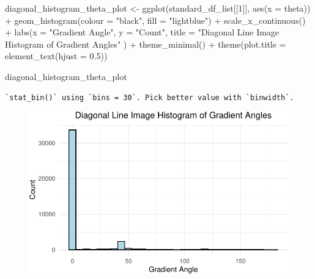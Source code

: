 \documentclass[
  letterpaper,
  DIV=11,
  numbers=noendperiod]{scrreprt}
\newenvironment{Shaded}{\begin{snugshade}}{\end{snugshade}}
\newcommand{\AttributeTok}[1]{\textcolor[rgb]{0.40,0.45,0.13}{#1}}
\newcommand{\DecValTok}[1]{\textcolor[rgb]{0.68,0.00,0.00}{#1}}
\newcommand{\FloatTok}[1]{\textcolor[rgb]{0.68,0.00,0.00}{#1}}
\newcommand{\FunctionTok}[1]{\textcolor[rgb]{0.28,0.35,0.67}{#1}}
\newcommand{\NormalTok}[1]{\textcolor[rgb]{0.00,0.23,0.31}{#1}}
\newcommand{\OtherTok}[1]{\textcolor[rgb]{0.00,0.23,0.31}{#1}}
\newcommand{\SpecialCharTok}[1]{\textcolor[rgb]{0.37,0.37,0.37}{#1}}
\newcommand{\StringTok}[1]{\textcolor[rgb]{0.13,0.47,0.30}{#1}}
\begin{document}
\begin{Shaded}
\begin{Highlighting}[]
\NormalTok{diagonal\_histogram\_theta\_plot }\OtherTok{\textless{}{-}}
  \FunctionTok{ggplot}\NormalTok{(standard\_df\_list[[}\DecValTok{1}\NormalTok{]], }\FunctionTok{aes}\NormalTok{(}\AttributeTok{x =}\NormalTok{ theta)) }\SpecialCharTok{+}
  \FunctionTok{geom\_histogram}\NormalTok{(}\AttributeTok{colour =} \StringTok{"black"}\NormalTok{, }\AttributeTok{fill =} \StringTok{"lightblue"}\NormalTok{) }\SpecialCharTok{+}
  \FunctionTok{scale\_x\_continuous}\NormalTok{() }\SpecialCharTok{+} 
  \FunctionTok{labs}\NormalTok{(}\AttributeTok{x =} \StringTok{"Gradient Angle"}\NormalTok{, }
       \AttributeTok{y =} \StringTok{"Count"}\NormalTok{, }
       \AttributeTok{title =} \StringTok{"Diagonal Line Image Histogram of Gradient Angles"}
\NormalTok{       ) }\SpecialCharTok{+}
  \FunctionTok{theme\_minimal}\NormalTok{() }\SpecialCharTok{+}
  \FunctionTok{theme}\NormalTok{(}\AttributeTok{plot.title =} \FunctionTok{element\_text}\NormalTok{(}\AttributeTok{hjust =} \FloatTok{0.5}\NormalTok{))}

\NormalTok{diagonal\_histogram\_theta\_plot}
\end{Highlighting}
\end{Shaded}

\begin{verbatim}
`stat_bin()` using `bins = 30`. Pick better value with `binwidth`.
\end{verbatim}

\begin{figure}[H]

{\centering \includegraphics{results_files/figure-pdf/unnamed-chunk-9-6.pdf}

}

\end{figure}
\end{document}
